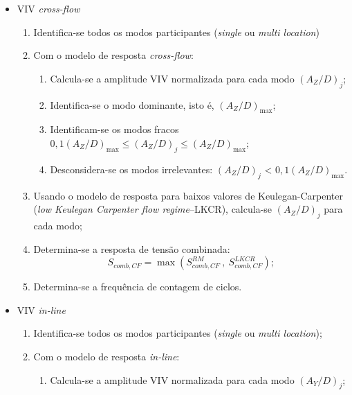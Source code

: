 \begin{itemize}

\item VIV \textit{cross-flow}\label{procedure_cf}

\begin{enumerate}
\item Identifica-se todos os modos participantes (\textit{single} ou \textit{multi location})

\item Com o modelo de resposta \textit{cross-flow}:
	\begin{enumerate}
    \item Calcula-se a amplitude VIV normalizada para cada modo ${(A_Z/D)}_j$;

	\item Identifica-se o modo dominante, isto é, ${(A_Z/D)}_{\max}$;

    \item Identificam-se os modos fracos $0,1{(A_Z/D)}_{\max} \leq {(A_Z/D)}_j \leq {(A_Z/D)}_{\max}$;

    \item Desconsidera-se os modos irrelevantes: ${(A_Z/D)}_j$ < $0,1{(A_Z/D)}_{\max}$.
    \end{enumerate}

\item Usando o modelo de resposta para baixos valores de Keulegan-Carpenter (\textit{low Keulegan Carpenter flow regime}--LKCR), calcula-se ${(A_Z/D)}_j$ para cada modo;

\item Determina-se a resposta de tensão combinada:
    \[
    S_{\mathit{comb}, \mathit{CF}} = \max\left( S_{\mathit{comb}, \mathit{CF}}^\mathit{RM} ~,~ S_{\mathit{comb}, \mathit{CF}}^\mathit{LKCR} \right);
    \]

\item Determina-se a frequência de contagem de ciclos.

\end{enumerate}

\item VIV \textit{in-line}

\begin{enumerate}
    \item Identifica-se todos os modos participantes (\textit{single} ou \textit{multi location});

    \item Com o modelo de resposta \textit{in-line}:

    \begin{enumerate}
    	\item Calcula-se a amplitude VIV normalizada para cada modo ${(A_Y/D)}_j$;


\end{enumerate}
\end{enumerate}
\end{itemize}
